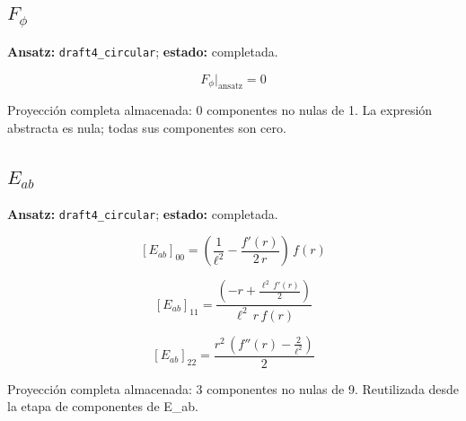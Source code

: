 \documentclass[11pt]{article}
\begin{document}
\subsection*{$ F_{\phi} $}
\textbf{Ansatz:} \texttt{draft4\_circular}; \textbf{estado:} completada.\par
\begin{dmath*}[breakdepth={5}]
F_{\phi}\big|_{\mathrm{ansatz}} = 0
\end{dmath*}
\par\smallskip
Proyección completa almacenada: 0 componentes no nulas de 1. La expresión abstracta es nula; todas sus componentes son cero.\par\medskip
{}
\subsection*{$ E_{ab} $}
\textbf{Ansatz:} \texttt{draft4\_circular}; \textbf{estado:} completada.\par
\begin{dmath*}[breakdepth={5}]
\left[E_{ab}\right]_{00} = \left(\frac{1}{{\ell}^{2}} - \frac{f'\!\left(r\right)}{2\,r}\right)\,f\!\left(r\right)
\end{dmath*}
\par\smallskip
\begin{dmath*}[breakdepth={5}]
\left[E_{ab}\right]_{11} = \frac{\left(-r + \frac{{\ell}^{2}\,f'\!\left(r\right)}{2}\right)}{{\ell}^{2}\,r\,f\!\left(r\right)}
\end{dmath*}
\par\smallskip
\begin{dmath*}[breakdepth={5}]
\left[E_{ab}\right]_{22} = \frac{{r}^{2}\,\left(f''\!\left(r\right) - \frac{2}{{\ell}^{2}}\right)}{2}
\end{dmath*}
\par\smallskip
Proyección completa almacenada: 3 componentes no nulas de 9. Reutilizada desde la etapa de componentes de E\_ab.\par\medskip
{}
\end{document}
